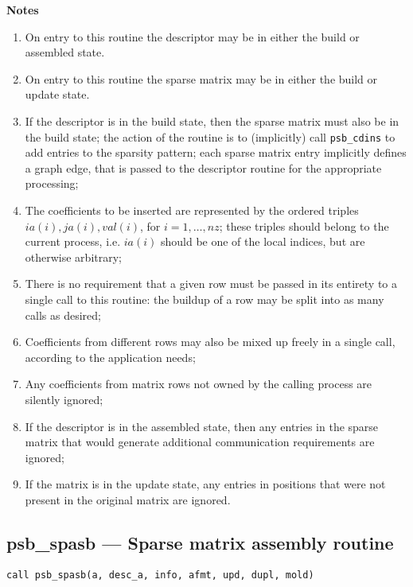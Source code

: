 {\par\noindent\large\bfseries Notes}
\begin{enumerate}
\item On entry to this routine the descriptor may be in either the
  build or assembled state.
\item On entry to this routine the sparse matrix may be in either the
  build or update state. 
\item If the descriptor is in the build state, then the sparse matrix
  must also be in the build state; the action of the routine is to
  (implicitly) call \verb|psb_cdins| to add entries to the sparsity
  pattern; each sparse matrix entry implicitly defines a graph edge,
  that is passed to the descriptor routine for the appropriate
  processing;
\item The coefficients to be inserted are represented by the ordered
  triples $ia(i),ja(i),val(i)$, for $i=1,\dots,nz$; these triples
  should belong to the current process, i.e. $ia(i)$ should be one of
  the local indices, but are otherwise arbitrary;
\item There is no
  requirement that a given row must be passed in its entirety to a
  single call to this routine: the buildup of a row may be split into
  as many calls as desired;
\item Coefficients from different rows   may also be mixed up freely
  in a single call, according to the application needs; 
\item Any coefficients from matrix rows not owned by the calling
  process are silently ignored;
\item If the descriptor is in the assembled state, then any entries in
  the sparse matrix that would generate additional communication
  requirements are  ignored; 
\item If the matrix is in the update state, any entries in positions
  that were not present in the original matrix are ignored. 
\end{enumerate}

%
%
\clearpage\subsection*{psb\_spasb --- Sparse matrix assembly routine}

\begin{verbatim}
call psb_spasb(a, desc_a, info, afmt, upd, dupl, mold)
\end{verbatim}

